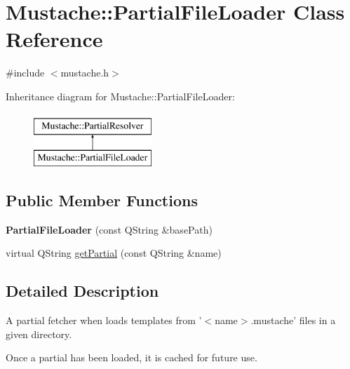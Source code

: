 \hypertarget{classMustache_1_1PartialFileLoader}{\section{Mustache\+:\+:Partial\+File\+Loader Class Reference}
\label{classMustache_1_1PartialFileLoader}
}


{\ttfamily \#include $<$mustache.\+h$>$}

Inheritance diagram for Mustache\+:\+:Partial\+File\+Loader\+:\begin{figure}[H]
\begin{center}
\leavevmode
\includegraphics[height=2.000000cm]{da/d31/classMustache_1_1PartialFileLoader}
\end{center}
\end{figure}
\subsection*{Public Member Functions}
\begin{DoxyCompactItemize}
\item 
\hypertarget{classMustache_1_1PartialFileLoader_aa29e049400b033d96c184a72b03306bf}{{\bfseries Partial\+File\+Loader} (const Q\+String \&base\+Path)}\label{classMustache_1_1PartialFileLoader_aa29e049400b033d96c184a72b03306bf}

\item 
virtual Q\+String \hyperlink{classMustache_1_1PartialFileLoader_a36ba8b817708a8755293db46bceb0dbb}{get\+Partial} (const Q\+String \&name)
\end{DoxyCompactItemize}


\subsection{Detailed Description}
A partial fetcher when loads templates from '$<$name$>$.mustache' files in a given directory.

Once a partial has been loaded, it is cached for future use. 

